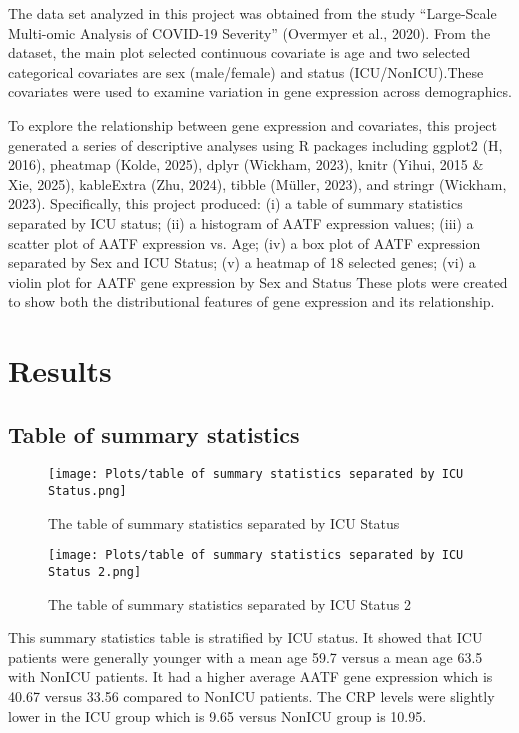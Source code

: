 \documentclass{article}
\begin{document}
The data set analyzed in this project was obtained from the study “Large-Scale Multi-omic Analysis of COVID-19 Severity” (Overmyer et al., 2020). From the dataset, the main plot selected continuous covariate is age and two selected categorical covariates are sex (male/female) and status (ICU/NonICU).These covariates were used to examine variation in gene expression across demographics.

To explore the relationship between gene expression and covariates, this project generated a series of descriptive analyses using R packages including ggplot2 (H, 2016), pheatmap (Kolde, 2025), dplyr (Wickham, 2023), knitr (Yihui, 2015 & Xie, 2025), kableExtra (Zhu, 2024), tibble (Müller, 2023), and stringr (Wickham, 2023). 
Specifically, this project produced:
(i) a table of summary statistics separated by ICU status;
(ii) a histogram of AATF expression values;
(iii) a scatter plot of AATF expression vs. Age;
(iv) a box plot of AATF expression separated by Sex and ICU Status;
(v) a heatmap of 18 selected genes;
(vi) a violin plot for AATF gene expression by Sex and Status
These plots were created to show both the distributional features of gene expression and its relationship.

\section{Results}
\subsection{Table of summary statistics}
\begin{figure}[H]
    \centering
    \texttt{[image: Plots/table of summary statistics separated by ICU Status.png]}
    \caption{The table of summary statistics separated by ICU Status}
    \label{fig:placeholder}
\end{figure}
\begin{figure}[H]
    \centering
    \texttt{[image: Plots/table of summary statistics separated by ICU Status 2.png]}
    \caption{The table of summary statistics separated by ICU Status 2}
    \label{fig:placeholder}
\end{figure}
This summary statistics table is stratified by ICU status. It showed that ICU patients were generally younger with a mean age 59.7 versus a mean age 63.5 with NonICU patients. It had a higher average AATF gene expression which is 40.67 versus 33.56 compared to NonICU patients. The CRP levels were slightly lower in the ICU group which is 9.65 versus NonICU group is 10.95.
\end{document}
